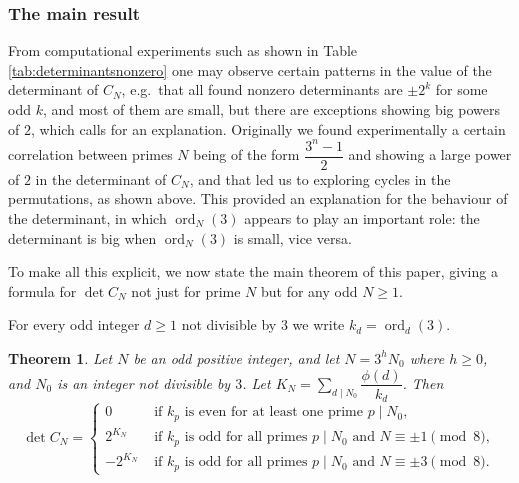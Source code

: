\documentclass[10pt]{article}
\newtheorem{theorem}{Theorem}
\theoremstyle{definition}
\newcommand{\dsum}{\displaystyle\sum}
\DeclareMathOperator{\ord}{ord}
\begin{document}
\subsubsection{The main result}
From computational experiments such as shown in Table \ref{tab:determinantsnonzero} one may observe
certain patterns in the value of the determinant of $ C_N $, e.g.\ that all found nonzero determinants
are $ \pm 2^k $ for some odd $ k $, and most of them are small, but there are exceptions showing big
powers of $ 2 $, which calls for an explanation. Originally we found experimentally a certain
correlation between primes $ N $ being of the form $ \dfrac{3^n-1}{2} $ and showing a large power of
$ 2 $ in the determinant of $ C_N $, and that led us to exploring cycles in the permutations, as
shown above. This provided an explanation for the behaviour of the determinant, in which $ \ord_N(3) $
appears to play an important role: the determinant is big when $ \ord_N(3) $ is small, vice versa.

To make all this explicit, we now state the main theorem of this paper, giving a formula for $ \det C_N $
not just for prime $ N $ but for any odd $ N \geq 1 $.

For every odd integer $ d \geq 1 $ not divisible by $ 3 $ we write $ k_d = \ord_d(3) $.

\begin{theorem} \label{thm:main}
    Let $ N $ be an odd positive integer, and let $ N = 3^h N_0 $ where $ h \geq 0 $, and
    $ N_0 $ is an integer not divisible by $ 3 $. Let $ K_N = \dsum_{d \mid N_0} \dfrac{\phi(d)}{k_d} $. Then
    \begin{equation}
        \det C_N = \begin{cases}
            0       & \text{ if } k_p \text{ is even for at least one prime } p \mid N_0, \\
            2^{K_N} & \text{ if } k_p \text{ is odd for all primes } p \mid N_0
            \text{ and } N \equiv \pm 1 \pmod{8}, \\
            -2^{K_N} & \text{ if } k_p \text{ is odd for all primes } p \mid N_0
            \text{ and } N \equiv \pm 3 \pmod{8}.
        \end{cases}
    \end{equation}
\end{theorem}
\end{document}
